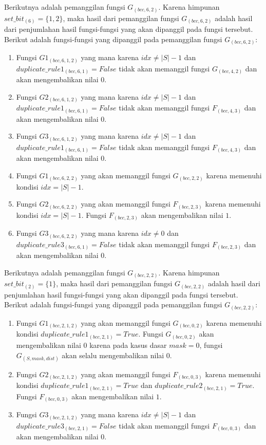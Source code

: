 Berikutnya adalah pemanggilan fungsi $ G_{(bcc, 6, 2)} $. Karena himpunan $ set\_bit_{(6)} = \{1, 2\} $, maka hasil dari pemanggilan fungsi $ G_{(bcc, 6, 2)} $ adalah hasil dari penjumlahan hasil fungsi-fungsi yang akan dipanggil pada fungsi tersebut. Berikut adalah fungsi-fungsi yang dipanggil pada pemanggilan fungsi $ G_{(bcc, 6, 2)} $:
\begin{enumerate}
	\item Fungsi $ G1_{(bcc, 6, 1, 2)} $ yang mana karena $ idx \neq |S|-1 $ dan $ duplicate\_rule1_{(bcc, 6, 1)} = False$ tidak akan memanggil fungsi $ G_{(bcc, 4, 2)} $ dan akan mengembalikan nilai $ 0 $.
	\item Fungsi $ G2_{(bcc, 6, 1, 2)} $ yang mana karena $ idx \neq |S|-1 $ dan $ duplicate\_rule1_{(bcc, 6, 1)} = False$ tidak akan memanggil fungsi $ F_{(bcc, 4, 3)} $ dan akan mengembalikan nilai $ 0 $.
	\item Fungsi $ G3_{(bcc, 6, 1, 2)} $ yang mana karena $ idx \neq |S|-1 $ dan $ duplicate\_rule1_{(bcc, 6, 1)} = False$ tidak akan memanggil fungsi $ F_{(bcc, 4, 3)} $ dan akan mengembalikan nilai $ 0 $.
	
	\item Fungsi $ G1_{(bcc, 6, 2, 2)} $ yang akan memanggil fungsi $ G_{(bcc, 2, 2)} $ karena memenuhi kondisi $ idx = |S| - 1 $.
	\item Fungsi $ G2_{(bcc, 6, 2, 2)} $ yang akan memanggil fungsi $ F_{(bcc, 2, 3)} $ karena memenuhi kondisi $ idx = |S| - 1 $. Fungsi $ F_{(bcc, 2, 3)} $ akan mengembalikan nilai $ 1 $.
	\item Fungsi $ G3_{(bcc, 6, 2, 2)} $ yang mana karena $ idx \neq 0 $ dan $ duplicate\_rule3_{(bcc, 6, 1)} = False$ tidak akan memanggil fungsi $ F_{(bcc, 2, 3)} $ dan akan mengembalikan nilai $ 0 $.	
\end{enumerate}

Berikutnya adalah pemanggilan fungsi $ G_{(bcc, 2, 2)} $. Karena himpunan $ set\_bit_{(2)} = \{1\} $, maka hasil dari pemanggilan fungsi $ G_{(bcc, 2, 2)} $ adalah hasil dari penjumlahan hasil fungsi-fungsi yang akan dipanggil pada fungsi tersebut. Berikut adalah fungsi-fungsi yang dipanggil pada pemanggilan fungsi $ G_{(bcc, 2, 2)} $:
\begin{enumerate}
	\item Fungsi $ G1_{(bcc, 2, 1, 2)} $ yang akan memanggil fungsi $ G_{(bcc, 0, 2)} $ karena memenuhi kondisi $ duplicate\_rule1_{(bcc, 2, 1)} = True$. Fungsi $ G_{(bcc, 0, 2)} $ akan mengembalikan nilai $ 0 $ karena pada kasus dasar $ mask=0 $, fungsi $ G_{(S, mask, dist)} $ akan selalu mengembalikan nilai 0.
	\item Fungsi $ G2_{(bcc, 2, 1, 2)} $ yang akan memanggil fungsi $ F_{(bcc, 0, 3)} $ karena memenuhi kondisi $ duplicate\_rule1_{(bcc, 2, 1)} = True$ dan $ duplicate\_rule2_{(bcc, 2, 1)} = True$. Fungsi $ F_{(bcc, 0, 3)} $ akan mengembalikan nilai $ 1 $.
	\item Fungsi $ G3_{(bcc, 2, 1, 2)} $ yang mana karena $ idx \neq |S|-1 $ dan $ duplicate\_rule3_{(bcc, 2, 1)} = False$ tidak akan memanggil fungsi $ F_{(bcc, 0, 3)} $ dan akan mengembalikan nilai $ 0 $.
\end{enumerate}

